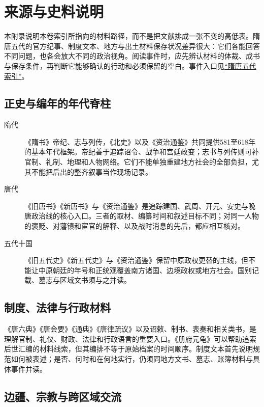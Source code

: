 \chapter{来源与史料说明}
\label{app:sources}

本附录说明本卷索引所指向的材料路径，而不是把文献排成一张不变的高低表。隋唐五代的官方纪事、制度文本、地方与出土材料保存状况差异很大：它们各能回答不同问题，也各会放大不同的政治视角。阅读事件时，应先辨认材料的体裁、成书与保存条件，再判断它能够确认的行动和必须保留的空白。事件入口见\hyperref[app:index]{“隋唐五代索引”}。

\section{正史与编年的年代脊柱}
\label{appsrc:chronology}

\begin{description}
  \item[隋代] 《隋书》帝纪、志与列传，《北史》以及《资治通鉴》共同提供581至618年的基本年代框架。帝纪善于追踪诏令、战争和宫廷政变；志书与列传则可补官制、礼制、地理和人物网络。它们不能单独重建地方社会的全部负担，尤其不能把后出的整齐叙事当作现场记录。
  \item[唐代] 《旧唐书》《新唐书》与《资治通鉴》是追踪建国、武周、开元、安史与晚唐政治线的核心入口。三者的取材、编纂时间和叙述目标不同；对同一人物的褒贬、对藩镇和宦官的解释、以及战时消息的先后，都应相互核对。
  \item[五代十国] 《旧五代史》《新五代史》与《资治通鉴》保留中原政权更替的主线，但不能让中原朝廷的年号和正统观覆盖南方诸国、边境政权或地方社会。国别记载、墓志与区域文书须与之并读。
\end{description}

\section{制度、法律与行政材料}
\label{appsrc:institutions}

《唐六典》《唐会要》《通典》《唐律疏议》以及诏敕、制书、表奏和相关类书，是理解官制、礼仪、财政、法律和行政语言的重要入口。《册府元龟》可以帮助追索后世汇编的材料线索，但其编排不等于原始档案的时间顺序。制度文本首先说明规范如何被表述；是否、何时和在何地实行，仍须同地方文书、墓志、账簿材料与具体事件并读。

\section{边疆、宗教与跨区域交流}
\label{appsrc:frontiers}

